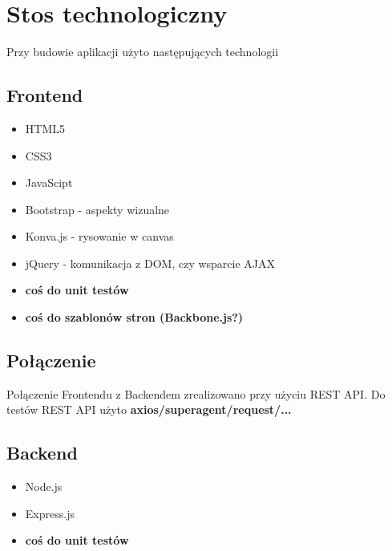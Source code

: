 \section{Stos technologiczny}

Przy budowie aplikacji użyto następujących technologii

\subsection{Frontend}
\begin{itemize}
	\item HTML5
	\item CSS3
	\item JavaScipt
	\item Bootstrap - aspekty wizualne
	\item Konva.js - rysowanie w canvas
	\item jQuery - komunikacja z DOM, czy wsparcie AJAX
	\item \textbf{coś do unit testów}
	\item \textbf{coś do szablonów stron (Backbone.js?)}
\end{itemize}

\subsection{Połączenie}
Połączenie Frontendu z Backendem zrealizowano przy użyciu REST API.
Do testów REST API użyto \textbf{axios/superagent/request/...}

\subsection{Backend}
\begin{itemize}
	\item Node.js
	\item Express.js
	\item \textbf{coś do unit testów}
\end{itemize}